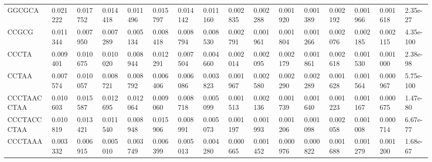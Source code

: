 \begin{samepage}
\begin{table}[h!]
\begin{tabular}{llllllllllllllll}
GGCGCA            &  0.021222                                          &  0.017752                            &  0.014418                 &  0.011496        &  0.015797        &  0.014142        &  0.011160        &  0.002835        &  0.002288        &  0.001920        &  0.001389        &  0.002192        &  0.001966        &  0.001618        &  2.35e-27 \\
CCGCG             &  0.011344                                          &  0.007950                            &  0.007289                 &  0.005134        &  0.008418        &  0.008794        &  0.008530        &  0.002791        &  0.001961        &  0.001804        &  0.001266        &  0.002076        &  0.002185        &  0.002115        &  4.35e-100 \\
CCCTA             &  0.009401                                          &  0.010675                            &  0.010020                 &  0.008944        &  0.012291        &  0.007504        &  0.004660        &  0.002014        &  0.002095        &  0.002179        &  0.001861        &  0.002618        &  0.001530        &  0.001000        &  2.38e-98 \\
CCTAA             &  0.007574                                          &  0.010057                            &  0.008721                 &  0.008792        &  0.006406        &  0.006086        &  0.003823        &  0.001967        &  0.002580        &  0.002290        &  0.002289        &  0.001628        &  0.001564        &  0.000967        &  5.75e-100 \\
CCCTAACCTAA       &  0.010603                                          &  0.015587                            &  0.012695                 &  0.012064        &  0.009060        &  0.008718        &  0.005099        &  0.001513        &  0.002136        &  0.001739        &  0.001640        &  0.001223        &  0.001167        &  0.000675        &  1.47e-80 \\
CCCTACCCTAA       &  0.010819                                          &  0.013421                            &  0.011540                 &  0.008948        &  0.015906        &  0.008991        &  0.005073        &  0.001197        &  0.001993        &  0.001206        &  0.001098        &  0.002058        &  0.001008        &  0.000714        &  6.67e-77 \\
CCCTAAA           &  0.003332                                          &  0.006915                            &  0.005010                 &  0.003749        &  0.006399        &  0.005013        &  0.004280        &  0.000665        &  0.001452        &  0.000976        &  0.000822        &  0.001688        &  0.001279        &  0.001200        &  1.68e-67 \\

\end{tabular}
\end{table}
\end{samepage}
